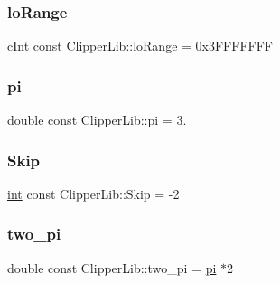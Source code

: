 \mbox{\label{namespace_clipper_lib_abc3cf08ce02b48ae18c320fd492108f1}} 
\subsubsection{\texorpdfstring{loRange}{loRange}}
{\footnotesize\ttfamily \mbox{\hyperlink{namespace_clipper_lib_a7156730a24951629192d4831334bafaa}{c\+Int}} const Clipper\+Lib\+::lo\+Range = 0x3\+F\+F\+F\+F\+F\+FF\hspace{0.3cm}{\ttfamily [static]}}

\mbox{\label{namespace_clipper_lib_a3226215bdfa5b0d7f01e40fc8f131485}} 
\subsubsection{\texorpdfstring{pi}{pi}}
{\footnotesize\ttfamily double const Clipper\+Lib\+::pi = 3.\hspace{0.3cm}{\ttfamily [static]}}

\mbox{\label{namespace_clipper_lib_a6e9f2a3266e14dced8a5fee78224c1bf}} 
\subsubsection{\texorpdfstring{Skip}{Skip}}
{\footnotesize\ttfamily \mbox{\hyperlink{draw_8hh_aa620a13339ac3a1177c86edc549fda9b}{int}} const Clipper\+Lib\+::\+Skip = -\/2\hspace{0.3cm}{\ttfamily [static]}}

\mbox{\label{namespace_clipper_lib_afdf9089a4f64d08fe88fa1b075fa6a71}} 
\subsubsection{\texorpdfstring{two\_pi}{two\_pi}}
{\footnotesize\ttfamily double const Clipper\+Lib\+::two\+\_\+pi = \mbox{\hyperlink{namespace_clipper_lib_a3226215bdfa5b0d7f01e40fc8f131485}{pi}} $\ast$2\hspace{0.3cm}{\ttfamily [static]}}

